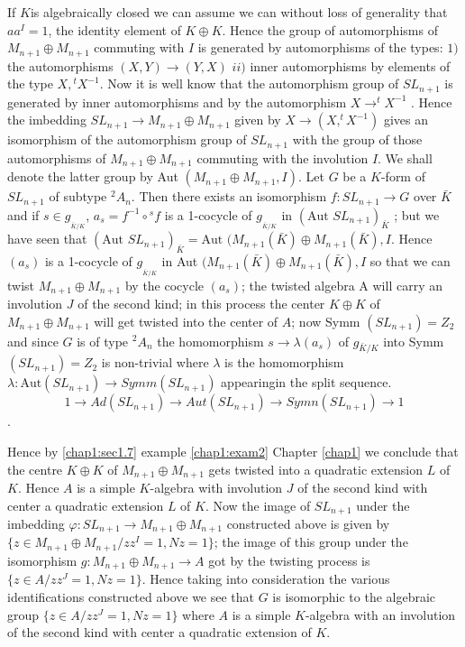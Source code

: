   If $K$\pageoriginale is algebraically closed we can assume we can
  without loss of 
  generality that $aa^I = 1$, the identity element of $K \oplus
  K$. Hence the group of automorphisms of $M_{n+1} \oplus M_{n+1}$ 
  commuting with $I$ is generated by automorphisms of the types: $1)$
  the automorphisms $(X,Y) \longrightarrow (Y,X)$  $ii)$ inner
  automorphisms by elements of the type $X, {}^t X^{-1}$. Now it is
  well know \cite{keyDi} that the automorphism  group of $SL_{n+1}$ is
  generated by inner automorphisms and by the automorphism $X
  \longrightarrow ^t X^{-1}$ . Hence the imbedding $SL_{n+1}
  \longrightarrow M_{n+1} \oplus M_{n+1}$ given by $X \longrightarrow
  (X, ^t X^{-1})$ gives an isomorphism of the automorphism group of
  $SL_{n+1}$ with the group of those automorphisms of $M_{n+1} \oplus
  M_{n+1}$ commuting with the involution $I$. We shall denote the
  latter group by Aut $(M_{n+1} \oplus M_{n+1},I)$. Let $G$ be a
  $K$-form of $SL_{n+1}$ of subtype ${}^2 A_n$. Then there exists an
  isomorphism $f : SL_{n+1} \longrightarrow G$ over $\bar{K}$ and if
  $s \in g_{_{\bar{K} /K}}$, $a_s = f^{-1} \circ{}^s f $ is a 1-cocycle of
  $g_{_{\bar{K} /K}}$ in $(\text{Aut } SL_{n+1})_{\bar{K}}$ ; but we
  have seen that $(\text{Aut } SL_{n+1})_{\bar{K}} = \text{Aut }
  (M_{n+1} (\bar{K}) \oplus M_{n+1} (\bar{K}), I$. Hence $(a_s)$ is a
  1-cocycle of  $g_{_{\bar{K} /K}}$ in Aut $(M_{n+1} (\bar{K})
  \oplus M_{n+1} (\bar{K}), I$ so that we can twist $M_{n+1} \oplus
  M_{n+1}$ by the cocycle $(a_s)$; the twisted algebra A will carry an
  involution $J$ of the second kind; in this process the center $K
  \oplus K$ of $M_{n+1} \oplus M_{n+1}$ will get twisted into
  the center of $A$; now Symm $(SL_{n+1}) = Z_2$ and since $G$ is of
  type ${}^2 A_n$ the homomorphism $s \longrightarrow \lambda (a_s)$
  of $g_{\bar{K}/K}$ into Symm $(SL_{n+1}) = Z_2$ is non-trivial
  where $\lambda$ is the homomorphism $\lambda : \text{Aut} (SL_{n+1})
  \longrightarrow Symm(SL_{n+1})$ appearing\pageoriginale in the split
 sequence.  
$$
1 \to Ad (SL_{n+1}) \to Aut (SL_{n+1}) \to Symn (SL_{n+1}) \to 1
$$.

 Hence  by \ref{chap1:sec1.7} example \ref{chap1:exam2} Chapter
 \ref{chap1} we conclude that the centre 
$K \oplus K$ of $M_{n+1} \oplus M_{n+1}$  gets twisted into a
quadratic extension $L$ of $K$. Hence $A$ is a simple $K$-algebra with
involution $J$ of the second kind with center a quadratic extension
$L$ of $K$. Now the image of $SL_{n+1}$ under the imbedding $\varphi
:SL_{n+1} \longrightarrow M_{n+1} \oplus M_{n+1}$ constructed above
is given by $\bigg\{ z \in  M_{n+1} \oplus M_{n+1} \bigg/   z z^I=1, Nz
= 1\bigg\} $; the image of this group under the isomorphism $g:
M_{n+1} \oplus M_{n+1} \longrightarrow A $ got by the twisting
process is $\bigg\{ z \in A \bigg / zz^J = 1, Nz = 1\bigg\}$. Hence
taking into consideration the various identifications constructed
above we see that $G$ is isomorphic to the algebraic group $\bigg\{ z
\in A \bigg / zz^J = 1, Nz = 1\bigg\}$ where $A$ is a simple $K$-algebra
with an involution of the second kind with center a quadratic
extension of $K$. 
  
